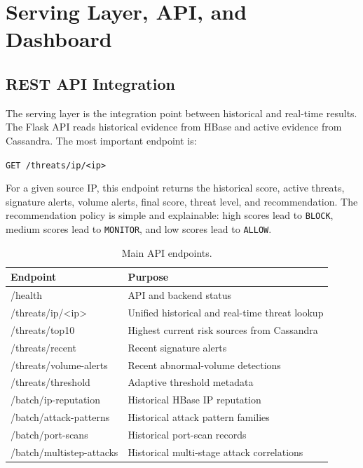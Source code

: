 \section{Serving Layer, API, and Dashboard}
\label{sec:serving}

\subsection{REST API Integration}

The serving layer is the integration point between historical and real-time results. The Flask API reads historical evidence from HBase and active evidence from Cassandra. The most important endpoint is:

\begin{center}
\texttt{GET /threats/ip/<ip>}
\end{center}

For a given source IP, this endpoint returns the historical score, active threats, signature alerts, volume alerts, final score, threat level, and recommendation. The recommendation policy is simple and explainable: high scores lead to \texttt{BLOCK}, medium scores lead to \texttt{MONITOR}, and low scores lead to \texttt{ALLOW}.

\begin{table}[H]
    \centering
    \small
    \caption{Main API endpoints.}
    \label{tab:api-endpoints-short}
    \begin{tabularx}{\textwidth}{>{\ttfamily}p{} X}
        \toprule
        Endpoint & Purpose \\
        \midrule
        /health & API and backend status \\
        /threats/ip/<ip> & Unified historical and real-time threat lookup \\
        /threats/top10 & Highest current risk sources from Cassandra \\
        /threats/recent & Recent signature alerts \\
        /threats/volume-alerts & Recent abnormal-volume detections \\
        /threats/threshold & Adaptive threshold metadata \\
        /batch/ip-reputation & Historical HBase IP reputation \\
        /batch/attack-patterns & Historical attack pattern families \\
        /batch/port-scans & Historical port-scan records \\
        /batch/multistep-attacks & Historical multi-stage attack correlations \\
        \bottomrule
    \end{tabularx}
\end{table}

